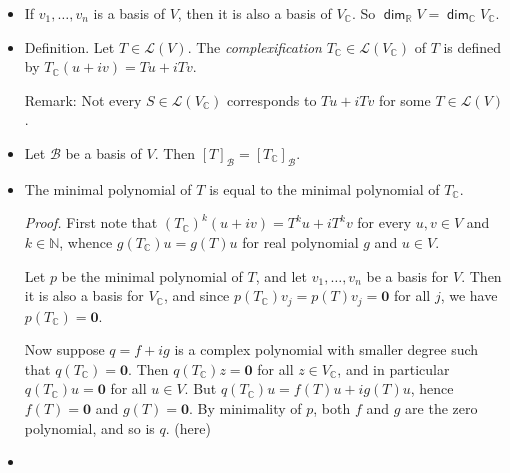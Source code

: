 \documentclass[11pt]{article}
\newcommand{\1}{\mathbf{1}}
\newcommand{\0}{\mathbf{0}}
\newcommand{\C}{\mathbb{C}}
\newcommand{\cL}{\mathcal{L}}
\newcommand{\R}{\mathbb{R}}
\newcommand{\N}{\mathbb{N}}
\DeclareMathOperator{\mydim}{\mathsf{dim}}
\newcommand{\spitem}{\item[$\circ$]}
\begin{document}
{\begin{itemize}
The \emph{complexification} $V_{\mathbb{C}}$ of $V$ is the complex vector space consisting of ordered pairs $(u,v)\in V_{\mathbb{C}}=V\times V$ with the addition defined naturally and the (complex) scalar multiplication defined by
\[
(a+ib)(u,v)=(au-bv,bu+av).
\]
If we use the notation $(u,v)=u+iv$, then the scalar multiplication follows the usual multiplication rules for complex numbers.

Short description: $V_\C = V + iV$ with sum of two vectors and multiplication of a vector by a complex scalar multiplication defined in the obvious way.

\item

If $v_1,\dots,v_n$ is a basis of $V$, then it is also a basis of $V_{\mathbb{C}}$.
So $\mydim_\R V = \mydim_\C V_\C$.

\item

Definition.
Let $T\in\mathcal{L}(V)$.
The \emph{complexification} $T_{\mathbb{C}} \in \cL(V_\C)$ of $T$ is defined by $T_{\mathbb{C}}(u+iv)=Tu+iTv$.

Remark: Not every $S \in \cL(V_\C)$ corresponds to $Tu + iTv$ for some $T \in \cL(V)$.

\item

Let $\mathcal{B}$ be a basis of $V$.
Then $[T]_{\mathcal{B}}=[T_{\mathbb{C}}]_{\mathcal{B}}$.

\spitem

The minimal polynomial of $T$ is equal to the minimal polynomial of $T_{\mathbb{C}}$.

\emph{Proof.}
First note that $(T_\C)^k (u + i v) = T^k u + i T^k v$ for every $u,v \in V$ and $k \in \N$, whence $g(T_\C)u=g(T)u$ for real polynomial $g$ and $u \in V$.

Let $p$ be the minimal polynomial of $T$, and let $v_1,\dots,v_n$ be a basis for $V$.
Then it is also a basis for $V_\C$, and since $p(T_\C) v_j = p(T) v_j = \0$ for all $j$, we have $p(T_\C) = \0$.

Now suppose $q = f + i g$ is a complex polynomial with smaller degree such that $q(T_\C)=\0$.
Then $q(T_\C)z=\0$ for all $z \in V_\C$, and in particular $q(T_\C)u=\0$ for all $u \in V$.
But $q(T_\C)u = f(T)u + i g(T)u$, hence $f(T)=\0$ and $g(T)=\0$.
By minimality of $p$, both $f$ and $g$ are the zero polynomial, and so is $q$.
\hfill
(here)

\spitem



\end{itemize}}
\end{document}
